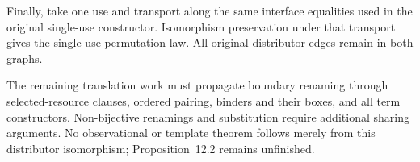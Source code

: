 Finally, take one use and transport along the same interface equalities
used in the original single-use constructor. Isomorphism preservation under
that transport gives the single-use permutation law. All original distributor
edges remain in both graphs.

The remaining translation work must propagate boundary renaming through
selected-resource clauses, ordered pairing, binders and their boxes, and all
term constructors. Non-bijective renamings and substitution require additional
sharing arguments. No observational or template theorem follows merely from
this distributor isomorphism; Proposition~12.2 remains unfinished.
